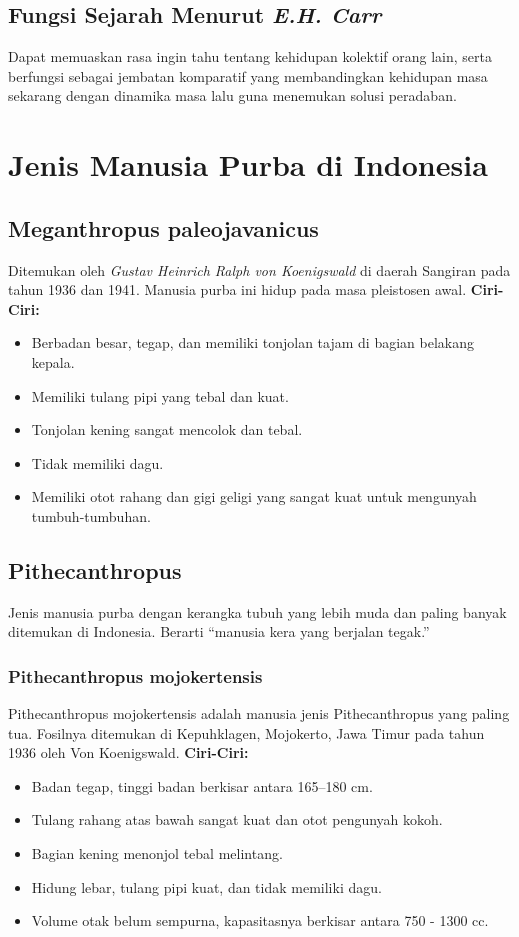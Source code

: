 \documentclass[12pt, a4paper]{article}
\begin{document}
\subsection{Fungsi Sejarah Menurut \textit{E.H. Carr}}
Dapat memuaskan rasa ingin tahu tentang kehidupan kolektif orang lain, serta berfungsi sebagai jembatan komparatif yang membandingkan kehidupan masa sekarang dengan dinamika masa lalu guna menemukan solusi peradaban.

\section{Jenis Manusia Purba di Indonesia}
\subsection{Meganthropus paleojavanicus}
Ditemukan oleh \textit{Gustav Heinrich Ralph von Koenigswald} di daerah Sangiran pada tahun 1936 dan 1941. Manusia purba ini hidup pada masa pleistosen awal.
\noindent \textbf{Ciri-Ciri:}
\begin{itemize}
	\item Berbadan besar, tegap, dan memiliki tonjolan tajam di bagian belakang kepala.
	\item Memiliki tulang pipi yang tebal dan kuat.
	\item Tonjolan kening sangat mencolok dan tebal.
	\item Tidak memiliki dagu.
	\item Memiliki otot rahang dan gigi geligi yang sangat kuat untuk mengunyah tumbuh-tumbuhan.
\end{itemize}

\subsection{Pithecanthropus}
Jenis manusia purba dengan kerangka tubuh yang lebih muda dan paling banyak ditemukan di Indonesia. Berarti ``manusia kera yang berjalan tegak.''
\subsubsection{Pithecanthropus mojokertensis}
Pithecanthropus mojokertensis adalah manusia jenis Pithecanthropus yang paling tua. Fosilnya ditemukan di Kepuhklagen, Mojokerto, Jawa Timur pada tahun 1936 oleh Von Koenigswald.
\noindent \textbf{Ciri-Ciri:}
\begin{itemize}
	\item Badan tegap, tinggi badan berkisar antara 165--180 cm.
	\item Tulang rahang atas bawah sangat kuat dan otot pengunyah kokoh.
	\item Bagian kening menonjol tebal melintang.
	\item Hidung lebar, tulang pipi kuat, dan tidak memiliki dagu.
	\item Volume otak belum sempurna, kapasitasnya berkisar antara 750 - 1300 cc.
\end{itemize}
\end{document}
